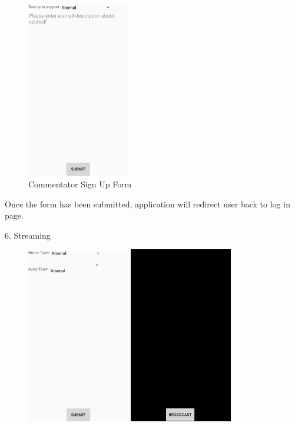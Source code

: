 \documentclass{article}
\begin{document}
\begin{flushleft}
\begin{figure}[H]
	\centering
	\includegraphics[width=0.40\textwidth]{signup}
	\caption{Commentator Sign Up Form}
	\label{fig:signup}
\end{figure}
Once the form has been submitted, application will redirect user back to log in page.\par
{\large 6. Streaming}\par
\begin{figure}[H]
	\includegraphics[width=0.40\textwidth]{matchmaking}
	\hfill
	\includegraphics[width=0.40\textwidth]{broadcast}

\end{figure}
\end{flushleft}
\end{document}
